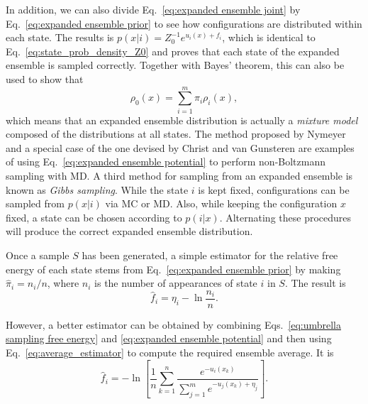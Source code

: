 \documentclass[aip,jcp,preprint,amsmath,amssymb]{revtex4-1}
\begin{document}
In addition, we can also divide Eq.~\eqref{eq:expanded ensemble joint} by Eq.~\eqref{eq:expanded ensemble prior} to see how configurations are distributed within each state. The results is $p(x|i) = Z_0^{-1} e^{u_i(x) + f_i}$, which is identical to Eq.~\eqref{eq:state_prob_density_Z0} and proves that each state of the expanded ensemble is sampled correctly. Together with Bayes' theorem, this can also be used to show that
\begin{equation}
\label{eq:mixture ensemble}
\rho_0(x) = \sum_{i=1}^m \pi_i \rho_i(x),
\end{equation}
which means that an expanded ensemble distribution is actually a \textit{mixture model}\cite{Lindsay_1995, Marin_2005} composed of the distributions at all states. The method proposed by Nymeyer\cite{Nymeyer_2010} and a special case of the one devised by Christ and van Gunsteren\cite{Christ_2007, *Christ_2008, *Christ_2009} are examples of using Eq.~\eqref{eq:expanded ensemble potential} to perform non-Boltzmann sampling with MD. A third method for sampling from an expanded ensemble is known as \textit{Gibbs sampling}.\cite{Marin_2005, Chodera_2011} While the state $i$ is kept fixed, configurations can be sampled from $p(x|i)$ via MC or MD. Also, while keeping the configuration $x$ fixed, a state can be chosen according to $p(i|x)$. Alternating these procedures will produce the correct expanded ensemble distribution.\cite{Chodera_2011}

Once a sample $S$ has been generated, a simple estimator for the relative free energy of each state stems from Eq.~\eqref{eq:expanded ensemble prior} by making $\hat \pi_i = n_i/n$, where $n_i$ is the number of appearances of state $i$ in $S$. The result is
\begin{equation}
\label{eq:expanded ensemble histogram estimator}
\hat f_i = \eta_i - \ln \frac{n_i}{n}.
\end{equation}

However, a better estimator can be obtained by combining Eqs.~\eqref{eq:umbrella sampling free energy} and \eqref{eq:expanded ensemble potential} and then using Eq.~\eqref{eq:average_estimator} to compute the required ensemble average. It is
\begin{equation}
\label{eq:expanded ensemble FEP estimator}
\hat f_i = -\ln \left[ \frac{1}{n}\sum_{k=1}^n \frac{e^{-u_i(x_k)}}{\sum_{j=1}^m e^{-u_j(x_k) + \eta_j}} \right].
\end{equation}
\end{document}
